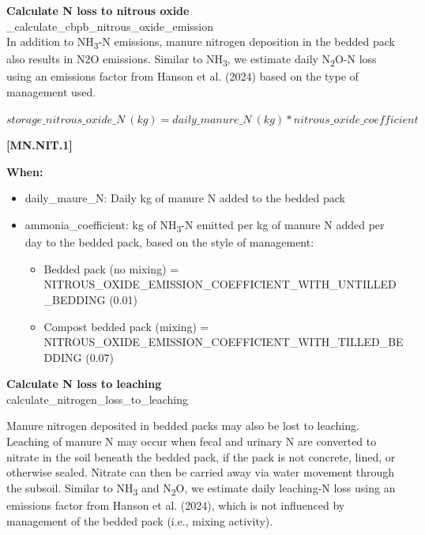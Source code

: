 \begin{refsection}
    \textbf{Calculate N loss to nitrous oxide}\\
    \_calculate\_cbpb\_nitrous\_oxide\_emission\\

    In addition to NH\textsubscript{3}-N emissions, manure nitrogen deposition in the bedded pack also results in N2O emissions. Similar to NH\textsubscript{3}, we estimate daily N\textsubscript{2}O-N loss using an emissions factor from Hanson et al. (2024) based on the type of management used. 
            \vspace{0.5cm}        
    
    \begin{center}
        \(storage\_nitrous\_oxide\_N\ (kg) = daily\_manure\_N\ (kg) * nitrous\_oxide\_coefficient\)
    \end{center}
        \vspace{0.5cm} 
    
            {\raggedleft \textbf{[MN.NIT.1]}\par}
            \vspace{0.5cm}

        \textbf{When:}

        \begin{itemize}
            \item daily\_maure\_N: Daily kg of manure N added to the bedded pack
            \item ammonia\_coefficient: kg of NH\textsubscript{3}-N emitted per kg of manure N added per day to the bedded pack, based on the style of management:
            \begin{itemize}
                \item Bedded pack (no mixing) = NITROUS\_OXIDE\_EMISSION\_COEFFICIENT\_WITH\_UNTILLED\_BEDDING (0.01) 
                \item Compost bedded pack (mixing) = NITROUS\_OXIDE\_EMISSION\_COEFFICIENT\_WITH\_TILLED\_BEDDING (0.07)
            \end{itemize}
        \end{itemize}
        \vspace{0.5cm} 
            
    \textbf{Calculate N loss to leaching} \\
    calculate\_nitrogen\_loss\_to\_leaching \\
    \vspace{0.1cm} 

    Manure nitrogen deposited in bedded packs may also be lost to leaching. Leaching of manure N may occur when fecal and urinary N are converted to nitrate in the soil beneath the bedded pack, if the pack is not concrete, lined, or otherwise sealed. Nitrate can then be carried away via water movement through the subsoil. Similar to NH\textsubscript{3} and N\textsubscript{2}O, we estimate daily leaching-N loss using an emissions factor from Hanson et al. (2024), which is not influenced by management of the bedded pack (i.e., mixing activity). 
            \vspace{0.5cm}        
    

\end{refsection}
